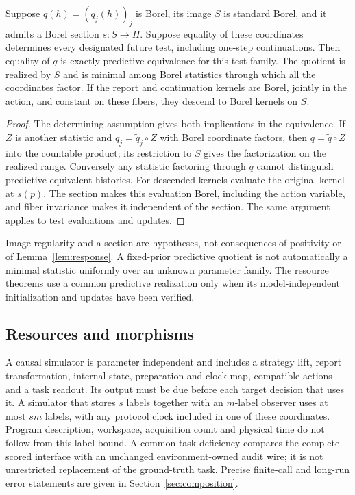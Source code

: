 \begin{lemma}\label{lem:quotient}
Suppose $q(h)=(q_j(h))_j$ is Borel, its image $S$ is standard Borel, and it admits a Borel section $s:S\to H$. Suppose equality of these coordinates determines every designated future test, including one-step continuations. Then equality of $q$ is exactly predictive equivalence for this test family. The quotient is realized by $S$ and is minimal among Borel statistics through which all the coordinates factor. If the report and continuation kernels are Borel, jointly in the action, and constant on these fibers, they descend to Borel kernels on $S$.
\end{lemma}
\begin{proof}
The determining assumption gives both implications in the equivalence. If $Z$ is another statistic and $q_j=\widetilde q_j\circ Z$ with Borel coordinate factors, then $q=\widetilde q\circ Z$ into the countable product; its restriction to $S$ gives the factorization on the realized range. Conversely any statistic factoring through $q$ cannot distinguish predictive-equivalent histories. For descended kernels evaluate the original kernel at $s(p)$. The section makes this evaluation Borel, including the action variable, and fiber invariance makes it independent of the section. The same argument applies to test evaluations and updates.
\end{proof}
Image regularity and a section are hypotheses, not consequences of positivity or of Lemma~\ref{lem:response}. A fixed-prior predictive quotient is not automatically a minimal statistic uniformly over an unknown parameter family. The resource theorems use a common predictive realization only when its model-independent initialization and updates have been verified.

\subsection{Resources and morphisms}
A causal simulator is parameter independent and includes a strategy lift, report transformation, internal state, preparation and clock map, compatible actions and a task readout. Its output must be due before each target decision that uses it. A simulator that stores $s$ labels together with an $m$-label observer uses at most $sm$ labels, with any protocol clock included in one of these coordinates. Program description, workspace, acquisition count and physical time do not follow from this label bound. A common-task deficiency compares the complete scored interface with an unchanged environment-owned audit wire; it is not unrestricted replacement of the ground-truth task. Precise finite-call and long-run error statements are given in Section~\ref{sec:composition}.
